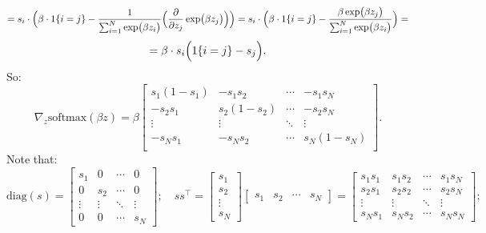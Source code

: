 \documentclass[12pt,a4paper]{article}
\begin{document}
        \[
            = s_i \cdot \Bigl( \beta \cdot 1\{i=j\} - \frac{1}{\sum_{i=1}^N \exp \bigl( \beta z_{i} \bigr)} \Bigl( \frac{\partial}{\partial z_j} \exp \bigl( \beta z_{j} \bigr) \Bigr) \Bigr)
            = s_i \cdot \Bigl( \beta \cdot 1\{i=j\} - \frac{\beta \exp \bigl( \beta z_{j} \bigr)}{\sum_{i=1}^N \exp \bigl( \beta z_{i} \bigr)}  \Bigr) =
        \]
        \[
            = \beta \cdot s_i \Bigl( 1\{i=j\} - s_j  \Bigr).
        \]
        So:
        \[
            \nabla_{z} \mathrm{softmax}(\beta z) =
            \beta \begin{bmatrix}
            s_1 (1 - s_1) & - s_1 s_2 & \cdots & - s_1 s_N \\
            - s_2 s_1 & s_2 (1 - s_2) & \cdots & - s_2 s_N \\
            \vdots & \vdots & \ddots & \vdots \\
            - s_N s_1 & - s_N s_2 & \cdots & s_N (1 - s_N) \\
            \end{bmatrix}.
        \]
        Note that:
        \[
            \mathrm{diag}(s) =
            \begin{bmatrix}
            s_1 & 0   & \cdots & 0 \\
            0   & s_2 & \cdots & 0 \\
            \vdots & \vdots & \ddots & \vdots \\
            0   & 0   & \cdots & s_N
            \end{bmatrix};
            \quad
            s s^\top =
            \begin{bmatrix}
            s_1 \\
            s_2 \\
            \vdots \\
            s_N
            \end{bmatrix}
            \begin{bmatrix}
            s_1 & s_2 & \cdots & s_N
            \end{bmatrix}
            =
            \begin{bmatrix}
            s_1 s_1 & s_1 s_2 & \cdots & s_1 s_N \\
            s_2 s_1 & s_2 s_2 & \cdots & s_2 s_N \\
            \vdots  & \vdots  & \ddots & \vdots  \\
            s_N s_1 & s_N s_2 & \cdots & s_N s_N
            \end{bmatrix};
        \]
\end{document}
